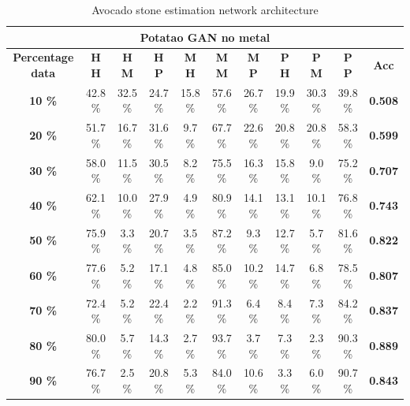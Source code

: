 \documentclass[11pt]{article}
\begin{document}
  \begin{table}[h!]
  \centering
  \begin{adjustbox}{max width=\textwidth}
  \begin{tabular}{*{11}{c}}%
  \hline
  \multicolumn{11}{c}{\textbf{Potatao GAN no metal}}
  \\
 \hline
 \textbf{Percentage data} & \textbf{H H} & \textbf{H M} & \textbf{H P} & \textbf{M H} & \textbf{M M} & \textbf{M P} & \textbf{P H} & \textbf{P M} & \textbf{P P} & \textbf{Acc}\\
 \hline
 \hline
 \textbf{10 \%}  & 42.8 \% & 32.5 \% & 24.7 \% & 15.8 \% & 57.6 \% & 26.7 \% & 19.9 \% & 30.3 \% & 39.8 \% & \textbf{0.508} \\
 \hline
 \textbf{20 \%} & 51.7 \% & 16.7 \% & 31.6 \% & 9.7 \% & 67.7 \% & 22.6 \% & 20.8 \% & 20.8 \% & 58.3 \% & \textbf{0.599} \\
 \hline
 \textbf{30 \%} & 58.0 \% & 11.5 \% & 30.5 \% & 8.2 \% & 75.5 \% & 16.3 \% & 15.8 \% & 9.0 \% & 75.2 \% & \textbf{0.707} \\
 \hline
 \textbf{40 \%} & 62.1 \% & 10.0 \% & 27.9 \% & 4.9 \% & 80.9 \% & 14.1 \% & 13.1 \% & 10.1 \%  & 76.8 \% & \textbf{0.743} \\
 \hline
 \textbf{50 \%} & 75.9 \% & 3.3 \% & 20.7 \% & 3.5 \% & 87.2 \% & 9.3 \% & 12.7 \% & 5.7 \% & 81.6 \% & \textbf{0.822} \\
 \hline
 \textbf{60 \%} & 77.6 \% & 5.2 \% & 17.1 \% & 4.8 \% & 85.0 \% & 10.2 \% & 14.7 \% & 6.8 \% & 78.5 \% & \textbf{0.807} \\
 \hline
 \textbf{70 \%} & 72.4 \% & 5.2 \% & 22.4 \% & 2.2 \% & 91.3 \% & 6.4 \% & 8.4 \% & 7.3 \% & 84.2 \% & \textbf{0.837} \\
 \hline
\textbf{80 \%} & 80.0 \% & 5.7 \% & 14.3 \%  & 2.7 \% & 93.7 \% & 3.7 \% & 7.3 \% & 2.3 \% & 90.3 \% & \textbf{0.889} \\
 \hline
 \textbf{90 \%} & 76.7 \% & 2.5 \% & 20.8 \% & 5.3 \% & 84.0 \% & 10.6 \% & 3.3 \% & 6.0 \% & 90.7 \% & \textbf{0.843} \\
 \hline
\end{tabular}
\end{adjustbox}
  \caption{Avocado stone estimation network architecture}
  \label{tab:experiments_avo_cnn}
\end{table}
\end{document}
